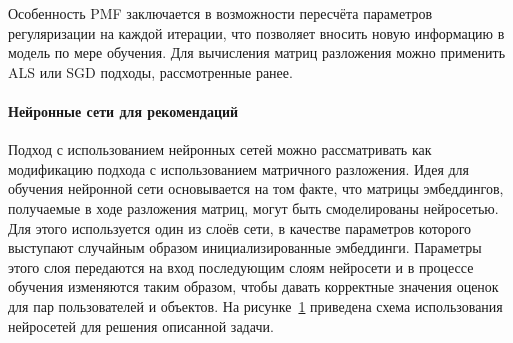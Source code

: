 Особенность PMF заключается в возможности пересчёта параметров регуляризации на каждой итерации, что позволяет вносить новую информацию в модель по мере обучения.
Для вычисления матриц разложения можно применить ALS или SGD подходы, рассмотренные ранее.


\paragraph{Нейронные сети для рекомендаций}

Подход с использованием нейронных сетей можно рассматривать как модификацию подхода с использованием матричного разложения.
Идея для обучения нейронной сети основывается на том факте, что матрицы эмбеддингов, получаемые в ходе разложения матриц, могут быть смоделированы нейросетью.
Для этого используется один из слоёв сети, в качестве параметров которого выступают случайным образом инициализированные эмбеддинги.
Параметры этого слоя передаются на вход последующим слоям нейросети и в процессе обучения изменяются таким образом, чтобы давать корректные значения оценок для пар пользователей и объектов.
На рисунке~\ref{fig:nn_idea} приведена схема использования нейросетей для решения описанной задачи.

\begin{figure}[h!]
\caption{}
\label{fig:nn_idea}
\end{figure}

\pagebreak
